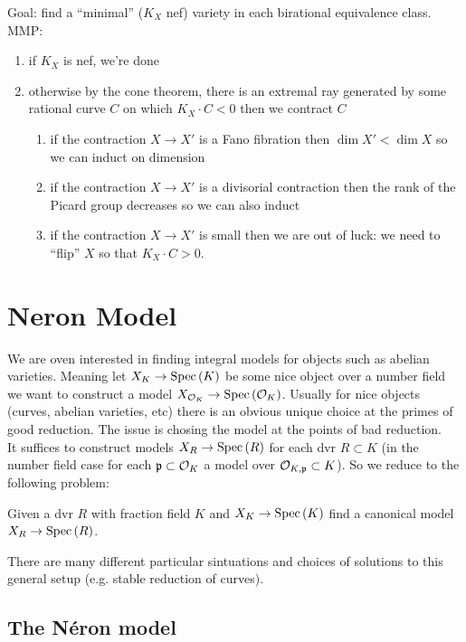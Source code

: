 \documentclass[12pt]{article}
\begin{document}
Goal: find a ``minimal'' ($K_X$ nef) variety in each birational equivalence class.  MMP:
\begin{enumerate}
\item if $K_X$ is nef, we're done
\item otherwise by the cone theorem, there is an extremal ray generated by some rational curve $C$ on which $K_X \cdot C < 0$ then we contract $C$
\begin{enumerate}
\item if the contraction $X \to X'$ is a Fano fibration then $\dim{X'} < \dim{X}$ so we can induct on dimension
\item if the contraction $X \to X'$ is a divisorial contraction then the rank of the Picard group decreases so we can also induct
\item if the contraction $X \to X'$ is small then we are out of luck: we need to ``flip'' $X$ so that $K_X \cdot C > 0$. 
\end{enumerate}
\end{enumerate}

\section{Neron Model}

\newcommand{\Neron}{N\'{e}ron\xspace}

We are oven interested in finding integral models for objects such as abelian varieties. Meaning let $X_K \to \mathrm{Spec}\left( K \right)$ be some nice object over a number field we want to construct a model $X_{\mathcal{O}_{K}} \to \mathrm{Spec}\left( \mathcal{O}_{K} \right)$. Usually for nice objects (curves, abelian varieties, etc) there is an obvious unique choice at the primes of good reduction. The issue is chosing the model at the points of bad reduction.
\\
It suffices to construct models $X_R \to \mathrm{Spec}\left( R \right)$ for each dvr $R \subset K$ (in the number field case for each $\mathfrak{p} \subset \mathcal{O}_{K}$ a model over $\mathcal{O}_{K,\mathfrak{p}} \subset K$). So we reduce to the following problem:
\begin{center}
Given a dvr $R$ with fraction field $K$ and $X_K \to \mathrm{Spec}\left( K \right)$ find a canonical model $X_R \to \mathrm{Spec}\left( R \right)$.
\end{center}

There are many different particular sintuations and choices of solutions to this general setup (e.g. stable reduction of curves). 

\subsection{The N\'{e}ron model}
\end{document}
